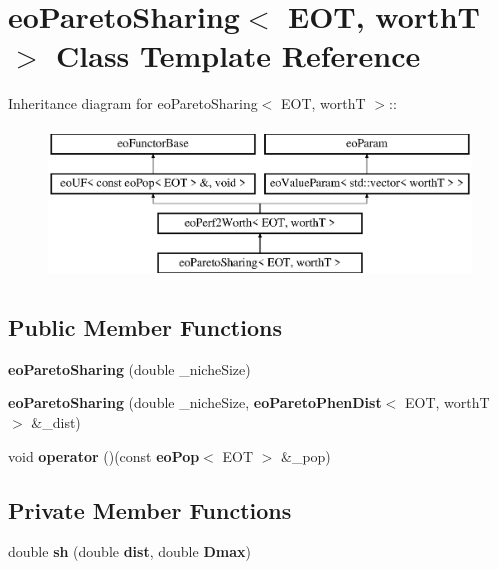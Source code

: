 \section{eo\-Pareto\-Sharing$<$ EOT, worth\-T $>$ Class Template Reference}
\label{classeoParetoSharing}
Inheritance diagram for eo\-Pareto\-Sharing$<$ EOT, worth\-T $>$::\begin{figure}[H]
\begin{center}
\leavevmode
\includegraphics[height=4cm]{classeoParetoSharing}
\end{center}
\end{figure}
\subsection*{Public Member Functions}
\begin{CompactItemize}
\item 
{\bf eo\-Pareto\-Sharing} (double \_\-niche\-Size)\label{classeoParetoSharing_99666671930abc479a2f5e5dd2914d41}

\item 
{\bf eo\-Pareto\-Sharing} (double \_\-niche\-Size, {\bf eo\-Pareto\-Phen\-Dist}$<$ EOT, worth\-T $>$ \&\_\-dist)\label{classeoParetoSharing_5ad0d5b6a1c1f4fc17bb9a319f18d645}

\item 
void {\bf operator} ()(const {\bf eo\-Pop}$<$ EOT $>$ \&\_\-pop)\label{classeoParetoSharing_df55496bf711d4614bcf42d157a4b4de}

\end{CompactItemize}
\subsection*{Private Member Functions}
\begin{CompactItemize}
\item 
double {\bf sh} (double {\bf dist}, double {\bf Dmax})\label{classeoParetoSharing_ce18ecb042033d564be6379869f2be88}

\end{CompactItemize}
